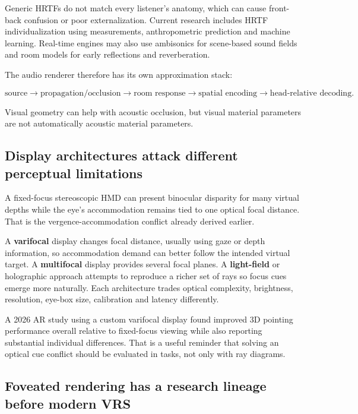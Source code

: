 Generic HRTFs do not match every listener's anatomy, which can cause front-back confusion or poor externalization. Current research includes HRTF individualization using measurements, anthropometric prediction and machine learning. Real-time engines may also use ambisonics for scene-based sound fields and room models for early reflections and reverberation.

The audio renderer therefore has its own approximation stack:

\[
\text{source} \rightarrow
\text{propagation/occlusion} \rightarrow
\text{room response} \rightarrow
\text{spatial encoding} \rightarrow
\text{head-relative decoding}.
\]

Visual geometry can help with acoustic occlusion, but visual material parameters are not automatically acoustic material parameters.

\subsection{Display architectures attack different perceptual limitations}\label{04-visual-computing-ii-ch035-display-architectures-attack-different-perceptual-limitations}

A fixed-focus stereoscopic HMD can present binocular disparity for many virtual depths while the eye's accommodation remains tied to one optical focal distance. That is the vergence-accommodation conflict already derived earlier.

A \textbf{varifocal} display changes focal distance, usually using gaze or depth information, so accommodation demand can better follow the intended virtual target. A \textbf{multifocal} display provides several focal planes. A \textbf{light-field} or holographic approach attempts to reproduce a richer set of rays so focus cues emerge more naturally. Each architecture trades optical complexity, brightness, resolution, eye-box size, calibration and latency differently.

A 2026 AR study using a custom varifocal display found improved 3D pointing performance overall relative to fixed-focus viewing while also reporting substantial individual differences. That is a useful reminder that solving an optical cue conflict should be evaluated in tasks, not only with ray diagrams.

\subsection{Foveated rendering has a research lineage before modern VRS}\label{04-visual-computing-ii-ch035-foveated-rendering-has-a-research-lineage-before-modern-vrs}

